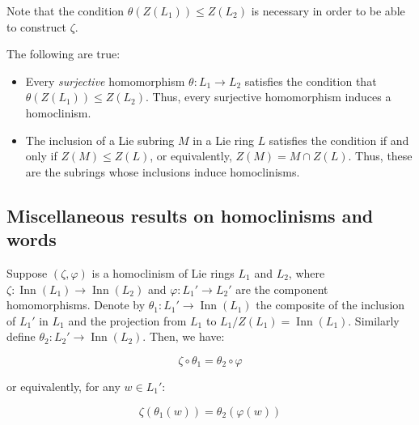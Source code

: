 Note that the condition $\theta(Z(L_1)) \le Z(L_2)$ is necessary in
order to be able to construct $\zeta$.

The following are true:

\begin{itemize}
\item Every {\em surjective} homomorphism $\theta:L_1 \to L_2$
  satisfies the condition that $\theta(Z(L_1)) \le Z(L_2)$. Thus,
  every surjective homomorphism induces a homoclinism.
\item The inclusion of a Lie subring $M$ in a Lie ring $L$ satisfies
  the condition if and only if $Z(M) \le Z(L)$, or equivalently, $Z(M)
  = M \cap Z(L)$. Thus, these are the subrings whose inclusions
  induce homoclinisms.
\end{itemize}

\subsection{Miscellaneous results on homoclinisms and words}\label{sec:homoclinism-misc-results-lie}

\begin{lemma}
  Suppose $(\zeta,\varphi)$ is a homoclinism of Lie rings $L_1$ and
  $L_2$, where $\zeta:\operatorname{Inn}(L_1) \to
  \operatorname{Inn}(L_2)$ and $\varphi:L_1' \to L_2'$ are the
  component homomorphisms. Denote by $\theta_1:L_1' \to
  \operatorname{Inn}(L_1)$ the composite of the inclusion of $L_1'$ in
  $L_1$ and the projection from $L_1$ to $L_1/Z(L_1) =
  \operatorname{Inn}(L_1)$. Similarly define $\theta_2:L_2' \to
  \operatorname{Inn}(L_2)$. Then, we have:
  
  $$\zeta \circ \theta_1 = \theta_2 \circ \varphi$$

  or equivalently, for any $w \in L_1'$:

  $$\zeta(\theta_1(w)) = \theta_2(\varphi(w))$$
\end{lemma}


